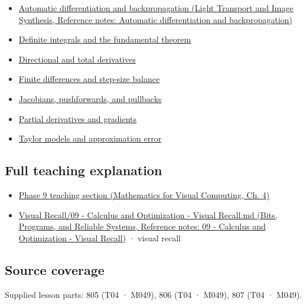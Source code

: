 \begin{itemize}
\tightlist
\item
  \href{../04-Light-Transport-and-Image-Synthesis/main.pdf\#nameddest=appendix-40df0855b4a7}{Automatic differentiation and backpropagation (Light Transport and Image Synthesis, Reference notes: Automatic differentiation and backpropagation)}
\item
  \hyperref[appendix-1a50e72435c2]{Definite integrals and the fundamental theorem}
\item
  \hyperref[appendix-e2d476574aab]{Directional and total derivatives}
\item
  \hyperref[appendix-e2d7b4f2161d]{Finite differences and step-size balance}
\item
  \hyperref[appendix-d8a7ddb675eb]{Jacobians, pushforwards, and pullbacks}
\item
  \hyperref[appendix-677b59746ae0]{Partial derivatives and gradients}
\item
  \hyperref[appendix-32f39e9a3738]{Taylor models and approximation error}
\end{itemize}

\subsection{Full teaching explanation}\label{appendix-7bc181935c42-full-teaching-explanation}

\begin{itemize}
\tightlist
\item
  \href{../02-Mathematics-for-Visual-Computing/main.pdf\#nameddest=01-foundations-i-ch020-functions-limits-continuity-and-scalar-change}{Phase 9 teaching section (Mathematics for Visual Computing, Ch. 4)}
\item
  \href{../01-Bits-Programs-and-Reliable-Systems/main.pdf\#nameddest=appendix-adf48f5dc5c1}{Visual Recall/09 - Calculus and Optimization - Visual Recall.md (Bits, Programs, and Reliable Systems, Reference notes: 09 - Calculus and Optimization - Visual Recall)} · visual recall
\end{itemize}

\subsection{Source coverage}\label{appendix-7bc181935c42-source-coverage}

Supplied lesson parts: 805 (T04 · M049), 806 (T04 · M049), 807 (T04 · M049).
